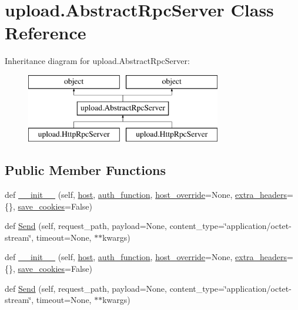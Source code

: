 \hypertarget{classupload_1_1AbstractRpcServer}{}\section{upload.\+Abstract\+Rpc\+Server Class Reference}
\label{classupload_1_1AbstractRpcServer}
Inheritance diagram for upload.\+Abstract\+Rpc\+Server\+:\begin{figure}[H]
\begin{center}
\leavevmode
\includegraphics[height=3.000000cm]{classupload_1_1AbstractRpcServer}
\end{center}
\end{figure}
\subsection*{Public Member Functions}
\begin{DoxyCompactItemize}
\item 
def \mbox{\hyperlink{classupload_1_1AbstractRpcServer_a3f6bc1bd16b52bd5a5c33a1fedeef2d0}{\+\_\+\+\_\+init\+\_\+\+\_\+}} (self, \mbox{\hyperlink{classupload_1_1AbstractRpcServer_ab7188d827e2faddcf970f524f5856192}{host}}, \mbox{\hyperlink{classupload_1_1AbstractRpcServer_aee0090a3bcf07b913a7dd596a5dabb8f}{auth\+\_\+function}}, \mbox{\hyperlink{classupload_1_1AbstractRpcServer_a783a4a7e4ffb776a57a3f267300a213b}{host\+\_\+override}}=None, \mbox{\hyperlink{classupload_1_1AbstractRpcServer_adbbf0109afc13d58d7815fa143cb779f}{extra\+\_\+headers}}=\{\}, \mbox{\hyperlink{classupload_1_1AbstractRpcServer_affe342205c4647d41b127f5a5634858b}{save\+\_\+cookies}}=False)
\item 
def \mbox{\hyperlink{classupload_1_1AbstractRpcServer_ad6555ae8993a52035191f8572762e741}{Send}} (self, request\+\_\+path, payload=None, content\+\_\+type=\char`\"{}application/octet-\/stream\char`\"{}, timeout=None, $\ast$$\ast$kwargs)
\item 
def \mbox{\hyperlink{classupload_1_1AbstractRpcServer_a3f6bc1bd16b52bd5a5c33a1fedeef2d0}{\+\_\+\+\_\+init\+\_\+\+\_\+}} (self, \mbox{\hyperlink{classupload_1_1AbstractRpcServer_ab7188d827e2faddcf970f524f5856192}{host}}, \mbox{\hyperlink{classupload_1_1AbstractRpcServer_aee0090a3bcf07b913a7dd596a5dabb8f}{auth\+\_\+function}}, \mbox{\hyperlink{classupload_1_1AbstractRpcServer_a783a4a7e4ffb776a57a3f267300a213b}{host\+\_\+override}}=None, \mbox{\hyperlink{classupload_1_1AbstractRpcServer_adbbf0109afc13d58d7815fa143cb779f}{extra\+\_\+headers}}=\{\}, \mbox{\hyperlink{classupload_1_1AbstractRpcServer_affe342205c4647d41b127f5a5634858b}{save\+\_\+cookies}}=False)
\item 
def \mbox{\hyperlink{classupload_1_1AbstractRpcServer_ad6555ae8993a52035191f8572762e741}{Send}} (self, request\+\_\+path, payload=None, content\+\_\+type=\char`\"{}application/octet-\/stream\char`\"{}, timeout=None, $\ast$$\ast$kwargs)
\end{DoxyCompactItemize}

